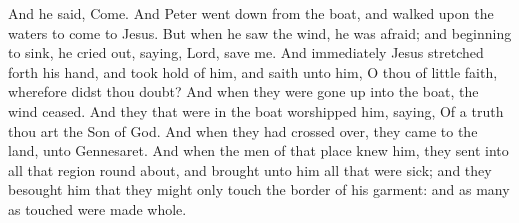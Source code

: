 And he said, Come. And Peter went down from the boat, and walked upon the waters to come to Jesus. But when he saw the wind, he was afraid; and beginning to sink, he cried out, saying, Lord, save me. And immediately Jesus stretched forth his hand, and took hold of him, and saith unto him, O thou of little faith, wherefore didst thou doubt? And when they were gone up into the boat, the wind ceased. And they that were in the boat worshipped him, saying, Of a truth thou art the Son of God.  And when they had crossed over, they came to the land, unto Gennesaret. And when the men of that place knew him, they sent into all that region round about, and brought unto him all that were sick; and they besought him that they might only touch the border of his garment: and as many as touched were made whole. 

